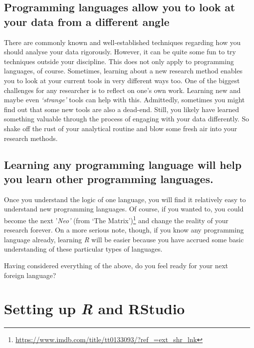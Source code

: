 \documentclass[
  letterpaper,
]{krantz}
\renewcommand{\href}[2]{#2\footnote{\url{#1}}}
\begin{document}
\section{Programming languages allow you to look at your data from a
different
angle}\label{programming-languages-allow-you-to-look-at-your-data-from-a-different-angle}

There are commonly known and well-established techniques regarding how
you should analyse your data rigorously. However, it can be quite some
fun to try techniques outside your discipline. This does not only apply
to programming languages, of course. Sometimes, learning about a new
research method enables you to look at your current tools in very
different ways too. One of the biggest challenges for any researcher is
to reflect on one's own work. Learning new and maybe even
\emph{`strange'} tools can help with this. Admittedly, sometimes you
might find out that some new tools are also a dead-end. Still, you
likely have learned something valuable through the process of engaging
with your data differently. So shake off the rust of your analytical
routine and blow some fresh air into your research methods.

\section{Learning any programming language will help you learn other
programming
languages.}\label{learning-any-programming-language-will-help-you-learn-other-programming-languages.}

Once you understand the logic of one language, you will find it
relatively easy to understand new programming languages. Of course, if
you wanted to, you could become the next '\emph{Neo'} (from
\href{https://www.imdb.com/title/tt0133093/?ref_=ext_shr_lnk}{`The
Matrix')} and change the reality of your research forever. On a more
serious note, though, if you know any programming language already,
learning \emph{R} will be easier because you have accrued some basic
understanding of these particular types of languages.

Having considered everything of the above, do you feel ready for your
next foreign language?


\chapter{\texorpdfstring{Setting up \emph{R} and
RStudio}{Setting up R and RStudio}}\label{setting-up-r-and-rstudio}
\end{document}

